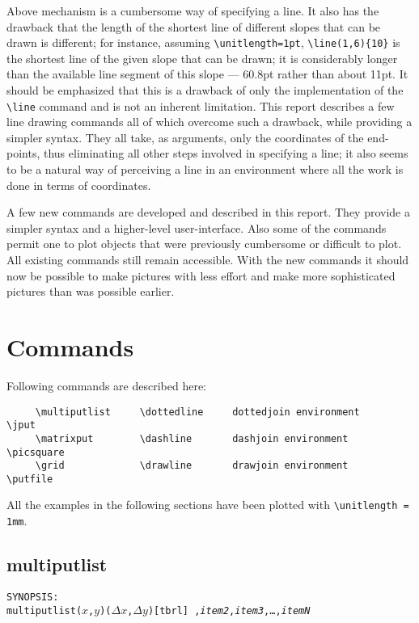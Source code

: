 Above mechanism is a cumbersome way of specifying a line. It also has the
drawback that the length of the shortest line of different slopes that
can be drawn is different; for instance, assuming \verb|\unitlength=1pt|,
\verb|\line(1,6){10}| is the shortest line of the given slope that can be
drawn; it is considerably longer than the available line segment of this
slope --- 60.8pt rather than about 11pt. It should be emphasized that this
is a drawback of only the implementation of the \verb|\line|
command and is not an inherent limitation. This report describes a few line
drawing commands all of which overcome such a drawback, while providing a
simpler syntax. They all take, as arguments, only the coordinates of the
end-points, thus eliminating all other steps involved in specifying a
line; it also seems to be a natural way of perceiving a line in an
environment where all the work is done in terms of coordinates.

A few new commands are developed and described in this report. They provide
a simpler syntax and a higher-level user-interface. Also some of the commands
permit one to plot objects that were previously cumbersome or difficult to
plot. All existing commands still remain accessible. With the new
commands it should now be possible to make pictures with less effort and
make more sophisticated pictures than was possible earlier.

\section{Commands}

Following commands are described here:
\begin{verbatim}
     \multiputlist     \dottedline     dottedjoin environment     \jput
     \matrixput        \dashline       dashjoin environment       \picsquare
     \grid             \drawline       drawjoin environment       \putfile
\end{verbatim}

All the examples in the following sections have been plotted with
\verb|\unitlength = 1mm|.

\subsection{{\tt \bs}multiputlist}

{\tt SYNOPSIS:\\
\hspace*{\leftmargin}%
\bs multiputlist($x$,$y$)($\Delta x$,$\Delta y$)[tbrl]%
,{\it item2},{\it item3},\ldots,{\it itemN}\rb}


